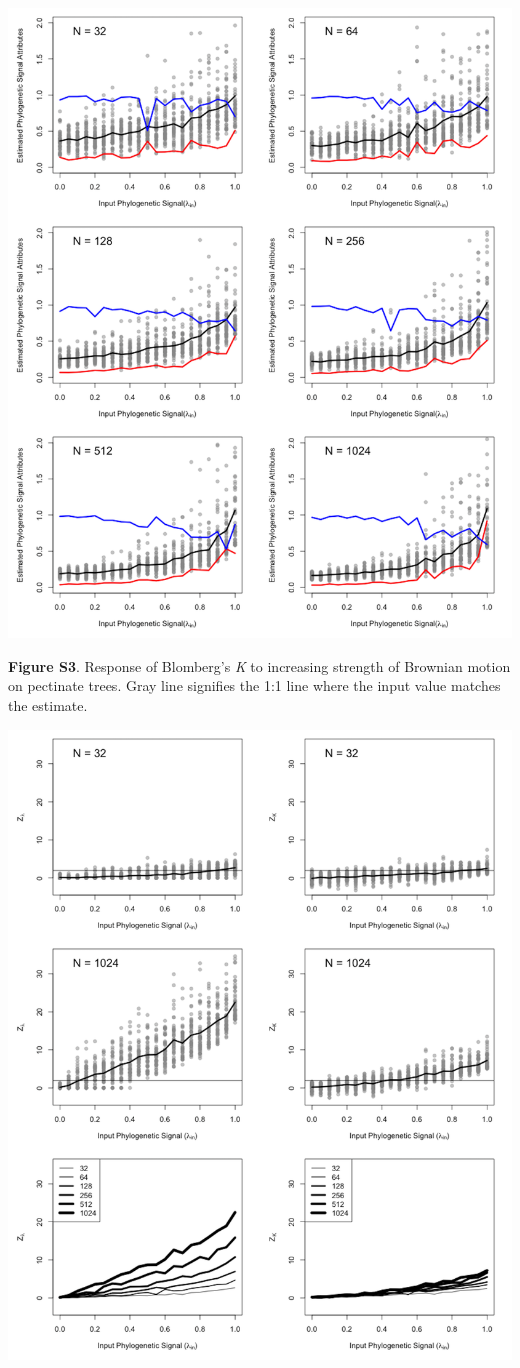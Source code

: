 \documentclass[
]{article}
\begin{document}
\includegraphics[width=0.95\linewidth]{fig.S3}

\textbf{Figure S3}. Response of Blomberg's \textit{K} to increasing
strength of Brownian motion on pectinate trees. Gray line signifies the
1:1 line where the input value matches the estimate.

\includegraphics[width=0.95\linewidth]{fig.S4}
\end{document}
